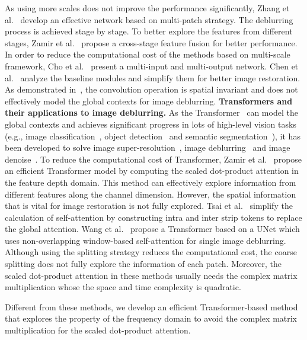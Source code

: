 \documentclass[10pt,twocolumn,letterpaper]{article}
\begin{document}
As using more scales does not improve the performance significantly, Zhang et al.~\cite{DMPHN} develop an effective network based on multi-patch strategy.
The deblurring process is achieved stage by stage.
To better explore the features from different stages, Zamir et al.~\cite{MPRNet} propose a cross-stage feature fusion for better performance.
In order to reduce the computational cost of the methods based on multi-scale framework, Cho et al.~\cite{MIMO} present a multi-input and multi-output network.
Chen et al.~\cite{NAFNet} analyze the baseline modules and simplify them for better image restoration.
As demonstrated in~\cite{Restormer}, the convolution operation is spatial invariant and does not effectively model the global contexts for image deblurring.
\vspace{-2mm}
{\flushleft \textbf{Transformers and their applications to image deblurring.}}
As the Transformer~\cite{Transformer} can model the global contexts and achieves significant progress in lots of high-level vision tasks (e.g., image classification~\cite{Swin}, object detection~\cite{Object_Detection,Object_Detection_2} and semantic segmentation~\cite{Segmentation,Segmentation_2}), it has been developed to solve image super-resolution~\cite{SwinIR}, image deblurring~\cite{Restormer,Stripformer} and image denoise~\cite{IPT,Uformer}.
To reduce the computational cost of Transformer, Zamir et al.~\cite{Restormer} propose an efficient Transformer model by computing the scaled dot-product attention in the feature depth domain.
This method can effectively explore information from different features along the channel dimension. However, the spatial information that is vital for image restoration is not fully explored.
Tsai et al.~\cite{Stripformer} simplify the calculation of self-attention by constructing intra and inter strip tokens to replace the global attention.
Wang et al.~\cite{Uformer} propose a Transformer based on a UNet which uses non-overlapping window-based self-attention for single image deblurring.
Although using the splitting strategy reduces the computational cost, the coarse splitting does not fully explore the information of each patch.
Moreover, the scaled dot-product attention in these methods usually needs the complex matrix multiplication whose the space and time complexity is quadratic.


Different from these methods, we develop an efficient Transformer-based method that explores the property of the frequency domain to avoid the complex matrix multiplication for the scaled dot-product attention.
\end{document}
